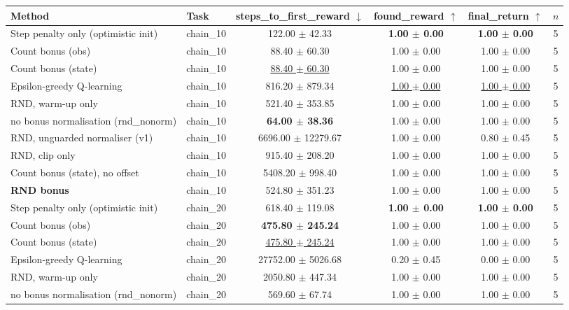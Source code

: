 \begin{tabular}{llcccc}
\toprule
Method & Task & steps\_to\_first\_reward $\downarrow$ & found\_reward $\uparrow$ & final\_return $\uparrow$ & $n$ \\
\midrule
Step penalty only (optimistic init) & chain\_10 & 122.00 $\pm$ 42.33 & \textbf{1.00 $\pm$ 0.00} & \textbf{1.00 $\pm$ 0.00} & 5 \\
Count bonus (obs) & chain\_10 & 88.40 $\pm$ 60.30 & 1.00 $\pm$ 0.00 & 1.00 $\pm$ 0.00 & 5 \\
Count bonus (state) & chain\_10 & \underline{88.40 $\pm$ 60.30} & 1.00 $\pm$ 0.00 & 1.00 $\pm$ 0.00 & 5 \\
Epsilon-greedy Q-learning & chain\_10 & 816.20 $\pm$ 879.34 & \underline{1.00 $\pm$ 0.00} & \underline{1.00 $\pm$ 0.00} & 5 \\
RND, warm-up only & chain\_10 & 521.40 $\pm$ 353.85 & 1.00 $\pm$ 0.00 & 1.00 $\pm$ 0.00 & 5 \\
no bonus normalisation (rnd\_nonorm) & chain\_10 & \textbf{64.00 $\pm$ 38.36} & 1.00 $\pm$ 0.00 & 1.00 $\pm$ 0.00 & 5 \\
RND, unguarded normaliser (v1) & chain\_10 & 6696.00 $\pm$ 12279.67 & 1.00 $\pm$ 0.00 & 0.80 $\pm$ 0.45 & 5 \\
RND, clip only & chain\_10 & 915.40 $\pm$ 208.20 & 1.00 $\pm$ 0.00 & 1.00 $\pm$ 0.00 & 5 \\
Count bonus (state), no offset & chain\_10 & 5408.20 $\pm$ 998.40 & 1.00 $\pm$ 0.00 & 1.00 $\pm$ 0.00 & 5 \\
\textbf{RND bonus} & chain\_10 & 524.80 $\pm$ 351.23 & 1.00 $\pm$ 0.00 & 1.00 $\pm$ 0.00 & 5 \\
\midrule
Step penalty only (optimistic init) & chain\_20 & 618.40 $\pm$ 119.08 & \textbf{1.00 $\pm$ 0.00} & \textbf{1.00 $\pm$ 0.00} & 5 \\
Count bonus (obs) & chain\_20 & \textbf{475.80 $\pm$ 245.24} & 1.00 $\pm$ 0.00 & 1.00 $\pm$ 0.00 & 5 \\
Count bonus (state) & chain\_20 & \underline{475.80 $\pm$ 245.24} & 1.00 $\pm$ 0.00 & 1.00 $\pm$ 0.00 & 5 \\
Epsilon-greedy Q-learning & chain\_20 & 27752.00 $\pm$ 5026.68 & 0.20 $\pm$ 0.45 & 0.00 $\pm$ 0.00 & 5 \\
RND, warm-up only & chain\_20 & 2050.80 $\pm$ 447.34 & 1.00 $\pm$ 0.00 & 1.00 $\pm$ 0.00 & 5 \\
no bonus normalisation (rnd\_nonorm) & chain\_20 & 569.60 $\pm$ 67.74 & 1.00 $\pm$ 0.00 & 1.00 $\pm$ 0.00 & 5 \\

\end{tabular}

